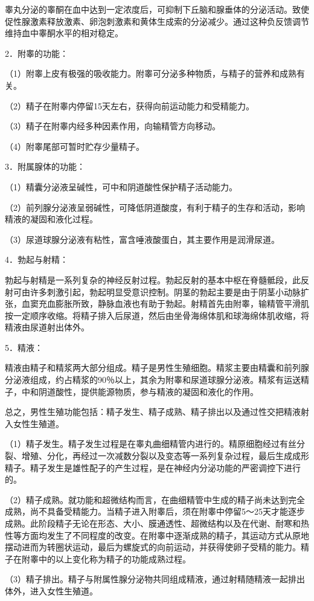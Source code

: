 \documentclass[12pt,UTF8,openany]{ctexbook}
\begin{document}
睾丸分泌的睾酮在血中达到一定浓度后，可抑制下丘脑和腺垂体的分泌活动。致使促性腺激素释放激素、卵泡刺激素和黄体生成索的分泌减少。通过这种负反馈调节维持血中睾酮水平的相对稳定。

2．附睾的功能：

（1）附睾上皮有极强的吸收能力。附睾可分泌多种物质，与精子的营养和成熟有关。

（2）精子在附睾内停留15天左右，获得向前运动能力和受精能力。

（3）精子在附睾内经多种因素作用，向输精管方向移动。

（4）附睾尾部可暂时贮存少量精子。

3．附属腺体的功能：

（1）精囊分泌液呈碱性，可中和阴道酸性保护精子活动能力。

（2）前列腺分泌液呈弱碱性，可降低阴道酸度，有利于精子的生存和活动，影响精液的凝固和液化过程。

（3）尿道球腺分泌液有粘性，富含唾液酸蛋白，其主要作用是润滑尿道。

4．勃起与射精：

勃起与射精是一系列复杂的神经反射过程。勃起反射的基本中枢在脊髓骶段，此反射可由许多刺激引起，勃起明显受意识控制。阴茎的勃起主要是由于阴茎小动脉扩张，血窦充血膨胀所致，静脉血液也有助于勃起。射精首先由附睾，输精管平滑肌按一定顺序收缩。将精子排入后尿道，然后由坐骨海绵体肌和球海绵体肌收缩，将精液由尿道射出体外。

5．精液：

精液由精子和精浆两大部分组成。精子是男性生殖细胞。精浆主要由精囊和前列腺分泌液组成，约占精浆的90％以上，其余为附睾和尿道球腺分泌液。精浆有运送精子，中和阴道酸性，提供能源物质，参与精液的凝固和液化的作用。

总之，男性生殖功能包括：精子发生、精子成熟、精子排出以及通过性交把精液射入女性生殖道。

（1）精子发生。精子发生过程是在睾丸曲细精管内进行的。精原细胞经过有丝分裂、增殖、分化，再经过一次减数分裂以及变态等一系列复杂过程，最后生成成形精子。精子发生是雄性配子的产生过程，是在神经内分泌功能的严密调控下进行的。

（2）精子成熟。就功能和超微结构而言，在曲细精管中生成的精子尚未达到完全成熟，尚不具备受精能力。当精子进入附睾后，须在附睾中停留5～25天才能逐步成熟。此阶段精子无论在形态、大小、膜通透性、超微结构以及在代谢、耐寒和热性等方面均发生了不同程度的改变。在附睾中逐渐成熟的精子，其运动方式从原地摆动进而为转圈状运动，最后为螺旋式的向前运动，并获得使卵子受精的能力。精子在附睾中的以上变化称为精子的功能成熟过程。

（3）精子排出。精子与附属性腺分泌物共同组成精液，通过射精随精液一起排出体外，进入女性生殖道。
\end{document}
